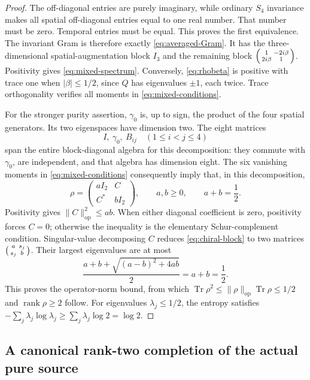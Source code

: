 \documentclass[11pt]{article}
\theoremstyle{definition}
\theoremstyle{remark}
\newcommand{\C}{\mathbb C}
\newcommand{\Tr}{\operatorname{Tr}}
\newcommand{\rank}{\operatorname{rank}}
\newcommand{\op}{\mathrm{op}}
\newcommand{\norm}[1]{\lVert#1\rVert}
\begin{document}
\begin{proof}
The off-diagonal entries are purely imaginary, while ordinary $S_4$
invariance makes all spatial off-diagonal entries equal to one real number.
That number must be zero. Temporal entries must be equal. This proves the
first equivalence. The invariant Gram is therefore exactly
\eqref{eq:averaged-Gram}. It has the three-dimensional spatial-augmentation
block $I_3$ and the remaining block
$\begin{psmallmatrix}1&-2i\beta\\2i\beta&1\end{psmallmatrix}$.
Positivity gives \eqref{eq:mixed-spectrum}. Conversely, \eqref{eq:rhobeta}
is positive with trace one when $|\beta|\le1/2$, since $Q$ has eigenvalues
$\pm1$, each twice. Trace orthogonality verifies all moments in
\eqref{eq:mixed-conditions}.

For the stronger purity assertion, $\gamma_0$ is, up to sign, the product
of the four spatial generators. Its two eigenspaces have dimension two.
The eight matrices
\[
 I,\ \gamma_0,\ B_{ij}\quad(1\le i<j\le4)
\]
span the entire block-diagonal algebra for this decomposition: they commute
with $\gamma_0$, are independent, and that algebra has dimension eight.
The six vanishing moments in \eqref{eq:mixed-conditions} consequently imply
that, in this decomposition,
\begin{equation}
 \rho=\begin{pmatrix}aI_2&C\\C^*&bI_2\end{pmatrix},
 \qquad a,b\ge0,\qquad a+b=\frac12.
 \label{eq:chiral-block}
\end{equation}
Positivity gives $\norm C_{\op}^2\le ab$. When either diagonal coefficient
is zero, positivity forces $C=0$; otherwise the inequality is the elementary
Schur-complement condition. Singular-value decomposing $C$ reduces
\eqref{eq:chiral-block} to two matrices
$\begin{psmallmatrix}a&s_j\\s_j&b\end{psmallmatrix}$.
Their largest eigenvalues are at most
\[
 \frac{a+b+\sqrt{(a-b)^2+4ab}}2=a+b=\frac12.
\]
This proves the operator-norm bound, from which
$\Tr\rho^2\le\norm\rho_{\op}\Tr\rho\le1/2$ and $\rank\rho\ge2$ follow.
For eigenvalues $\lambda_j\le1/2$, the entropy satisfies
$-\sum_j\lambda_j\log\lambda_j\ge\sum_j\lambda_j\log2=\log2$.
\end{proof}

\subsection{A canonical rank-two completion of the actual pure source}
\end{document}
